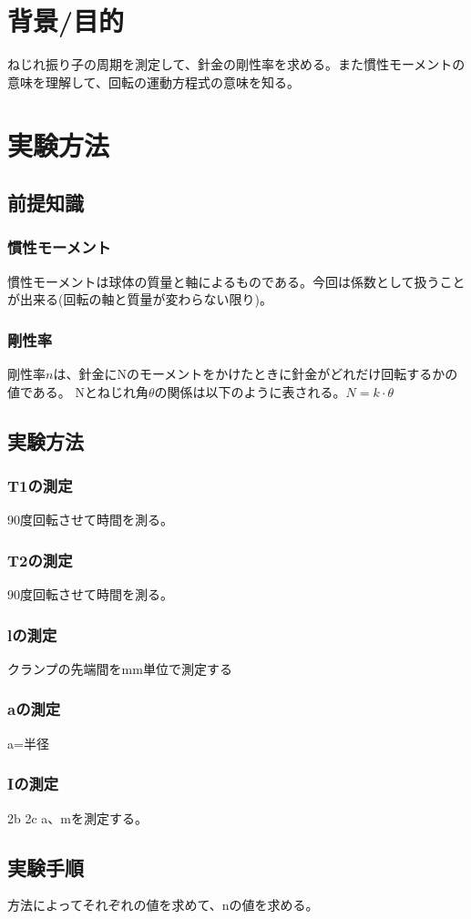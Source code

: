 \documentclass[a4paper,11pt]{ltjsarticle}
\begin{document}
\section{背景/目的}
ねじれ振り子の周期を測定して、針金の剛性率を求める。また慣性モーメントの意味を理解して、回転の運動方程式の意味を知る。
\section{実験方法}
\subsection{前提知識}
\subsubsection{慣性モーメント}
慣性モーメントは球体の質量と軸によるものである。今回は係数として扱うことが出来る(回転の軸と質量が変わらない限り)。
\subsubsection{剛性率}
剛性率$n$は、針金にNのモーメントをかけたときに針金がどれだけ回転するかの値である。
Nとねじれ角$\theta$の関係は以下のように表される。$N = k \cdot \theta$
\subsection{実験方法}
\subsubsection{T1の測定}
90度回転させて時間を測る。
\subsubsection{T2の測定}
90度回転させて時間を測る。
\subsubsection{lの測定}
クランプの先端間をmm単位で測定する
\subsubsection{aの測定}
a=半径
\subsubsection{Iの測定}
2b 2c a、mを測定する。
\subsection{実験手順}
方法によってそれぞれの値を求めて、nの値を求める。
\end{document}
